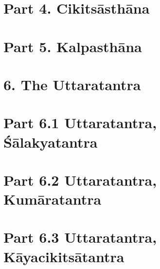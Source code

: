 \documentclass[12pt,tikz
    ]{book}
\begin{document}
        \part{Part 4. Cikitsāsthāna}
        
        
            \thispagestyle{empty}
        
            \thispagestyle{empty}
        
            \thispagestyle{empty}
        
        \part{Part 5. Kalpasthāna}
       
        
            \thispagestyle{empty}
        
            \thispagestyle{empty}
            \thispagestyle{empty}
        
            \thispagestyle{empty}
        
            \thispagestyle{empty}      
        
            \thispagestyle{empty}
        
            \thispagestyle{empty}
        
       \thispagestyle{empty}
        
            \thispagestyle{empty}
        

\part{6. The Uttaratantra} 



        \part{Part 6.1 Uttaratantra, Śālakyatantra} %
                
        
            \thispagestyle{empty}
            
    \part{Part 6.2 Uttaratantra, Kumāratantra} %
                
     
     \part{Part 6.3 Uttaratantra, Kāyacikitsātantra} %
     
\end{document}
